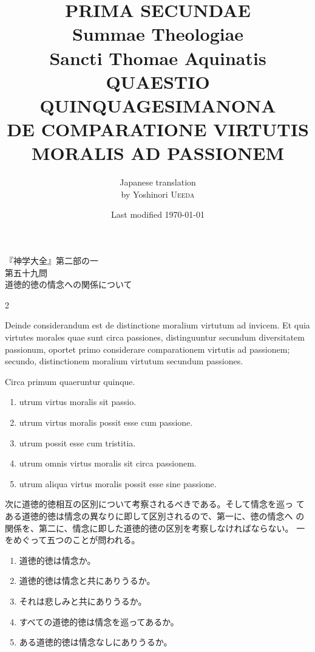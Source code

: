 \documentclass[paper=a4paper,fontsize=10pt,jafontsize=9pt,titlepage]{jlreq}
\title{{\bfseries PRIMA SECUNDAE}\\{\Huge Summae Theologiae}\\Sancti Thomae
Aquinatis\\{\sffamily QUAESTIO QUINQUAGESIMANONA}\\DE COMPARATIONE VIRTUTIS MORALIS AD PASSIONEM}
\author{Japanese translation\\by Yoshinori {\scshape Ueeda}}
\date{Last modified \today}
\begin{document}
\maketitle
\thispagestyle{empty}

\begin{center}
{\LARGE 『神学大全』第二部の一}\\
{\Large 第五十九問\\道徳的徳の情念への関係について}
\end{center}

\begin{paracol}{2}

Deinde considerandum est de distinctione moralium virtutum ad
 invicem. Et quia virtutes morales quae sunt circa passiones,
 distinguuntur secundum diversitatem passionum, oportet primo
 considerare comparationem virtutis ad passionem; secundo,
 distinctionem moralium virtutum secundum passiones.


 Circa primum quaeruntur quinque. 
  
\begin{enumerate}
 \item utrum virtus moralis sit passio.
 \item utrum virtus moralis possit esse cum passione.
 \item utrum possit esse cum tristitia.
 \item utrum omnis virtus moralis sit circa passionem.
 \item utrum aliqua virtus moralis possit esse sine passione.
\end{enumerate}

\switchcolumn

次に道徳的徳相互の区別について考察されるべきである。そして情念を巡っ
てある道徳的徳は情念の異なりに即して区別されるので、第一に、徳の情念へ
の関係を、第二に、情念に即した道徳的徳の区別を考察しなければならない。
一をめぐって五つのことが問われる。

\begin{enumerate}
 \item 道徳的徳は情念か。
 \item 道徳的徳は情念と共にありうるか。
 \item それは悲しみと共にありうるか。
 \item すべての道徳的徳は情念を巡ってあるか。
 \item ある道徳的徳は情念なしにありうるか。
\end{enumerate}

\end{paracol}
\newpage
{}
{}
\setcounter{section}{1}
\setcounter{subsection}{0}
\end{document}
